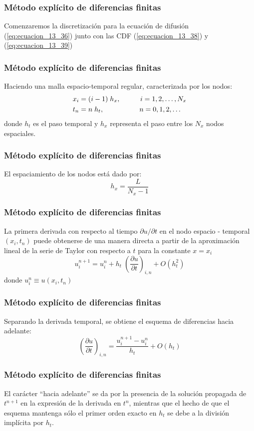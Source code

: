 \documentclass[12pt]{beamer}
\begin{document}
\begin{frame}
\frametitle{Método explícito de diferencias finitas}
Comenzaremos la discretización para la ecuación de difusión (\ref{eq:ecuacion_13_36}) junto con las CDF (\ref{eq:ecuacion_13_38}) y (\ref{eq:ecuacion_13_39})
\end{frame}
\begin{frame}
\frametitle{Método explícito de diferencias finitas}
Haciendo una malla espacio-temporal regular, caracterizada por los nodos:
\begin{align}
x_{i} &= (i - 1) \; h_{x}, \hspace{1cm} i = 1, 2, \ldots, N_{x} \label{eq:ecuacion_13_40} \\
t_{n} &= n \; h_{t}, \hspace{1.8cm} n = 0, 1, 2, \ldots \label{eq:ecuacion_13_41}
\end{align}
donde $h_{t}$ es el paso temporal y $h_{x}$ representa el paso entre los $N_{x}$ nodos espaciales.
\end{frame}
\begin{frame}
\frametitle{Método explícito de diferencias finitas}
El espaciamiento de los nodos está dado por:
\begin{equation}
h_{x} = \dfrac{L}{N_{x} - 1}
\label{eq:ecuacion_13_42}
\end{equation}
\end{frame}
\begin{frame}
\frametitle{Método explícito de diferencias finitas}
La primera derivada con respecto al tiempo $\partial u / \partial t$ en el nodo espacio - temporal $(x_{i}, t_{n})$ puede obtenerse de una manera directa a partir de la aproximación lineal de la serie de Taylor con respecto a $t$ para la constante $x = x_{i}$
\[ u_{i}^{n + 1} = u_{i}^{n} + h_{t} \; \left( \dfrac{\partial u}{\partial t} \right)_{i,n} + O(h_{t}^{2}) \]
donde $u_{i}^{n} \equiv u(x_{i}, t_{n})$
\end{frame}
\begin{frame}
\frametitle{Método explícito de diferencias finitas}
Separando la derivada temporal, se obtiene el esquema de diferencias hacia adelante:
\begin{equation}
\left( \dfrac{\partial u}{\partial t} \right)_{i,n} = \dfrac{u_{i}^{n + 1} -u_{i}^{n}}{h_{t}} + O(h_{t})
\label{eq:ecuacion_13_43}
\end{equation}
\end{frame}
\begin{frame}
\frametitle{Método explícito de diferencias finitas}
El carácter \enquote{hacia adelante} se da por la presencia de la solución propagada de $t^{n + 1}$ en la expresión de la derivada en $t^{n}$, mientras que el hecho de que el esquema mantenga sólo el primer orden exacto en $h_{t}$ se debe a la división implícita por $h_{t}$.
\end{frame}
\end{document}

